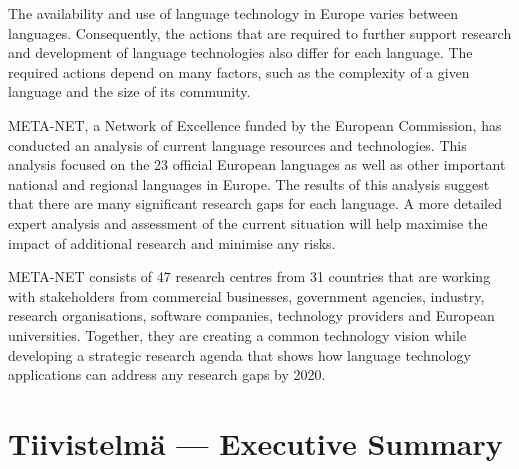 \documentclass[]{../../metanetpaper}
\begin{document}
\begin{Parallel}[c]{70mm}{70mm}
{The availability and use of language technology in Europe varies between
languages. Consequently, the actions that are required to further support
research and development of language technologies also differ for each
language. The required actions depend on many factors, such as the complexity
of a given language and the size of its community.

META-NET, a Network of Excellence funded by the European Commission, has
conducted an analysis of current language resources and technologies. This
analysis focused on the 23 official European languages as well as other
important national and regional languages in Europe. The results of this
analysis suggest that there are many significant research gaps for each
language. A more detailed expert analysis and assessment of the current
situation will help maximise the impact of additional research and minimise any
risks.

META-NET consists of 47 research centres from 31 countries that are working
with stakeholders from commercial businesses, government agencies, industry,
research organisations, software companies, technology providers and European
universities. Together, they are creating a common technology vision while
developing a strategic research agenda that shows how language technology
applications can address any research gaps by 2020.
}

\ParallelPar


  \clearpage
  \tableofcontents
  \clearpage


\section{Tiivistelmä --- Executive Summary}

\end{Parallel}
\end{document}
